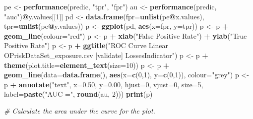 \documentclass[
]{article}
\newenvironment{Shaded}{\begin{snugshade}}{\end{snugshade}}
\newcommand{\CommentTok}[1]{\textcolor[rgb]{0.56,0.35,0.01}{\textit{#1}}}
\newcommand{\DataTypeTok}[1]{\textcolor[rgb]{0.13,0.29,0.53}{#1}}
\newcommand{\DecValTok}[1]{\textcolor[rgb]{0.00,0.00,0.81}{#1}}
\newcommand{\FloatTok}[1]{\textcolor[rgb]{0.00,0.00,0.81}{#1}}
\newcommand{\KeywordTok}[1]{\textcolor[rgb]{0.13,0.29,0.53}{\textbf{#1}}}
\newcommand{\NormalTok}[1]{#1}
\newcommand{\OperatorTok}[1]{\textcolor[rgb]{0.81,0.36,0.00}{\textbf{#1}}}
\newcommand{\StringTok}[1]{\textcolor[rgb]{0.31,0.60,0.02}{#1}}
\begin{document}
\begin{Shaded}
\begin{Highlighting}[]
\NormalTok{pe <-}\StringTok{ }\KeywordTok{performance}\NormalTok{(predic, }\StringTok{"tpr"}\NormalTok{, }\StringTok{"fpr"}\NormalTok{)}
\NormalTok{au <-}\StringTok{ }\KeywordTok{performance}\NormalTok{(predic, }\StringTok{"auc"}\NormalTok{)}\OperatorTok{@}\NormalTok{y.values[[}\DecValTok{1}\NormalTok{]]}
\NormalTok{pd <-}\StringTok{ }\KeywordTok{data.frame}\NormalTok{(}\DataTypeTok{fpr=}\KeywordTok{unlist}\NormalTok{(pe}\OperatorTok{@}\NormalTok{x.values), }\DataTypeTok{tpr=}\KeywordTok{unlist}\NormalTok{(pe}\OperatorTok{@}\NormalTok{y.values))}
\NormalTok{p <-}\StringTok{ }\KeywordTok{ggplot}\NormalTok{(pd, }\KeywordTok{aes}\NormalTok{(}\DataTypeTok{x=}\NormalTok{fpr, }\DataTypeTok{y=}\NormalTok{tpr))}
\NormalTok{p <-}\StringTok{ }\NormalTok{p }\OperatorTok{+}\StringTok{ }\KeywordTok{geom_line}\NormalTok{(}\DataTypeTok{colour=}\StringTok{"red"}\NormalTok{)}
\NormalTok{p <-}\StringTok{ }\NormalTok{p }\OperatorTok{+}\StringTok{ }\KeywordTok{xlab}\NormalTok{(}\StringTok{"False Positive Rate"}\NormalTok{) }\OperatorTok{+}\StringTok{ }\KeywordTok{ylab}\NormalTok{(}\StringTok{"True Positive Rate"}\NormalTok{)}
\NormalTok{p <-}\StringTok{ }\NormalTok{p }\OperatorTok{+}\StringTok{ }\KeywordTok{ggtitle}\NormalTok{(}\StringTok{"ROC Curve Linear OPriskDataSet_exposure.csv [validate] LossesIndicator"}\NormalTok{)}
\NormalTok{p <-}\StringTok{ }\NormalTok{p }\OperatorTok{+}\StringTok{ }\KeywordTok{theme}\NormalTok{(}\DataTypeTok{plot.title=}\KeywordTok{element_text}\NormalTok{(}\DataTypeTok{size=}\DecValTok{10}\NormalTok{))}
\NormalTok{p <-}\StringTok{ }\NormalTok{p }\OperatorTok{+}\StringTok{ }\KeywordTok{geom_line}\NormalTok{(}\DataTypeTok{data=}\KeywordTok{data.frame}\NormalTok{(), }\KeywordTok{aes}\NormalTok{(}\DataTypeTok{x=}\KeywordTok{c}\NormalTok{(}\DecValTok{0}\NormalTok{,}\DecValTok{1}\NormalTok{), }\DataTypeTok{y=}\KeywordTok{c}\NormalTok{(}\DecValTok{0}\NormalTok{,}\DecValTok{1}\NormalTok{)), }\DataTypeTok{colour=}\StringTok{"grey"}\NormalTok{)}
\NormalTok{p <-}\StringTok{ }\NormalTok{p }\OperatorTok{+}\StringTok{ }\KeywordTok{annotate}\NormalTok{(}\StringTok{"text"}\NormalTok{, }\DataTypeTok{x=}\FloatTok{0.50}\NormalTok{, }\DataTypeTok{y=}\FloatTok{0.00}\NormalTok{, }\DataTypeTok{hjust=}\DecValTok{0}\NormalTok{, }\DataTypeTok{vjust=}\DecValTok{0}\NormalTok{, }\DataTypeTok{size=}\DecValTok{5}\NormalTok{,}
                  \DataTypeTok{label=}\KeywordTok{paste}\NormalTok{(}\StringTok{"AUC ="}\NormalTok{, }\KeywordTok{round}\NormalTok{(au, }\DecValTok{2}\NormalTok{)))}
\KeywordTok{print}\NormalTok{(p)}

\CommentTok{# Calculate the area under the curve for the plot.}



\end{Highlighting}
\end{Shaded}
\end{document}
